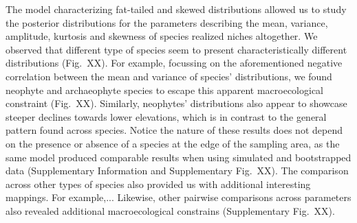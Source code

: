 \documentclass[11pt, a4paper]{article}
\begin{document}
The model characterizing fat-tailed and skewed distributions allowed us to study the posterior distributions for the parameters describing the mean, variance, amplitude, kurtosis and skewness of species realized niches altogether. We observed that different type of species seem to present characteristically different distributions (Fig.~XX). For example, focussing on the aforementioned negative correlation between the mean and variance of species' distributions, we found neophyte and archaeophyte species to escape this apparent macroecological constraint (Fig.~XX). Similarly, neophytes' distributions also appear to showcase steeper declines towards lower elevations, which is in contrast to the general pattern found across species. Notice the nature of these results does not depend on the presence or absence of a species at the edge of the sampling area, as the same model produced comparable results when using simulated and bootstrapped data (Supplementary Information and Supplementary Fig.~XX). The comparison across other types of species also provided us with additional interesting mappings. For example,... Likewise, other pairwise comparisons across parameters also revealed additional macroecological constrains (Supplementary Fig.~XX).

\end{document}
